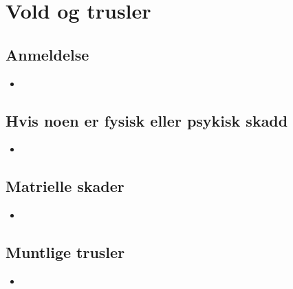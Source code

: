 \newpage
\chapter{Vold og trusler}
	\section{Anmeldelse}
		\begin{itemize}
			\item
		\end{itemize}
	\section{Hvis noen er fysisk eller psykisk skadd}
		\begin{itemize}
			\item
		\end{itemize}
	\section{Matrielle skader} 
		\begin{itemize}
			\item
		\end{itemize}
	\section{Muntlige trusler}
		\begin{itemize}
			\item
		\end{itemize}

